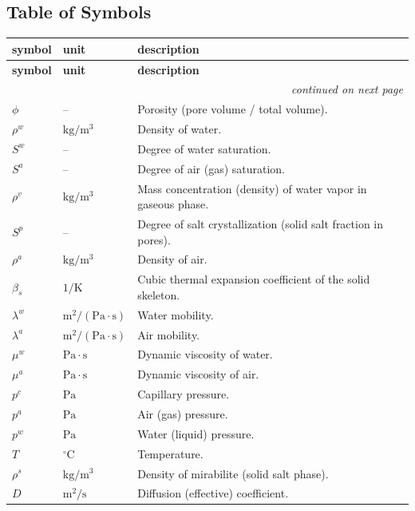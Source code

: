 \documentclass[12pt]{article}
\begin{document}

\subsection{Table of Symbols}

\renewcommand{\arraystretch}{1.25}
\noindent
\begin{longtable}{p{2.5cm} p{3.0cm} p{9.0cm}}
\toprule
\textbf{symbol} & \textbf{unit} & \textbf{description}\\
\midrule
\endfirsthead

\toprule
\textbf{symbol} & \textbf{unit} & \textbf{description}\\
\midrule
\endhead

\midrule
\multicolumn{3}{r}{\emph{continued on next page}}\\
\endfoot

\bottomrule
\endlastfoot

$\phi$ & -- & Porosity (pore volume / total volume).\\
$\rho^{w}$ & $\mathrm{kg/m^3}$ & Density of water.\\
$S^{w}$ & -- & Degree of water saturation.\\
$S^{a}$ & -- & Degree of air (gas) saturation.\\
$\rho^{v}$ & $\mathrm{kg/m^3}$ & Mass concentration (density) of water vapor in gaseous phase.\\
$S^{p}$ & -- & Degree of salt crystallization (solid salt fraction in pores).\\
$\rho^{a}$ & $\mathrm{kg/m^3}$ & Density of air.\\
$\beta_{s}$ & $\mathrm{1/K}$ & Cubic thermal expansion coefficient of the solid skeleton.\\
$\lambda^{w}$ & $\mathrm{m^2/(Pa\cdot s)}$ & Water mobility.\\
$\lambda^{a}$ & $\mathrm{m^2/(Pa\cdot s)}$ & Air mobility.\\
$\mu^{w}$ & $\mathrm{Pa\cdot s}$ & Dynamic viscosity of water.\\
$\mu^{a}$ & $\mathrm{Pa\cdot s}$ & Dynamic viscosity of air.\\
$p^{c}$ & $\mathrm{Pa}$ & Capillary pressure.\\
$p^{a}$ & $\mathrm{Pa}$ & Air (gas) pressure.\\
$p^{w}$ & $\mathrm{Pa}$ & Water (liquid) pressure.\\
$T$ & $\mathrm{^\circ C}$ & Temperature.\\
$\rho^{s}$ & $\mathrm{kg/m^3}$ & Density of mirabilite (solid salt phase).\\
$D$ & $\mathrm{m^2/s}$ & Diffusion (effective) coefficient.\\


\end{longtable}
\end{document}
